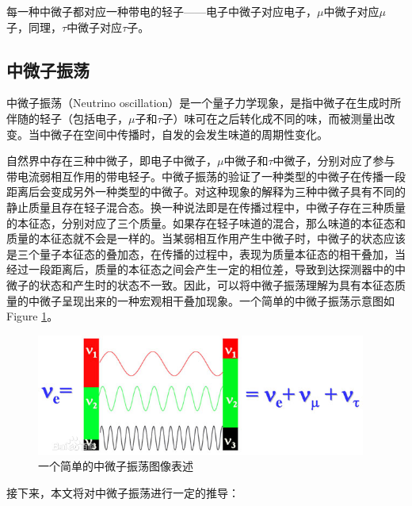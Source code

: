 \documentclass[10pt,a4paper]{article}
\begin{document}
每一种中微子都对应一种带电的轻子——电子中微子对应电子，$\mu$中微子对应$\mu$子，同理，$\tau$中微子对应$\tau$子。

\newpage

\subsection{中微子振荡}\label{sub:01}


中微子振荡（Neutrino oscillation）是一个量子力学现象，是指中微子在生成时所伴随的轻子（包括电子，$\mu$子和$\tau$子）味可在之后转化成不同的味，而被测量出改变。当中微子在空间中传播时，自发的会发生味道的周期性变化。

自然界中存在三种中微子，即电子中微子，$\mu$中微子和$\tau$中微子，分别对应了参与带电流弱相互作用的带电轻子。中微子振荡的验证了一种类型的中微子在传播一段距离后会变成另外一种类型的中微子。对这种现象的解释为三种中微子具有不同的静止质量且存在轻子混合态。换一种说法即是在传播过程中，中微子存在三种质量的本征态，分别对应了三个质量。如果存在轻子味道的混合，那么味道的本征态和质量的本征态就不会是一样的。当某弱相互作用产生中微子时，中微子的状态应该是三个量子本征态的叠加态，在传播的过程中，表现为质量本征态的相干叠加，当经过一段距离后，质量的本征态之间会产生一定的相位差，导致到达探测器中的中微子的状态和产生时的状态不一致。因此，可以将中微子振荡理解为具有本征态质量的中微子呈现出来的一种宏观相干叠加现象。一个简单的中微子振荡示意图如Figure \ref{fig:10}。


\begin{figure}[H]
 \centering
 \includegraphics[height=4cm]{images/中微子振荡示意图.jpg}
 \caption{一个简单的中微子振荡图像表述\cite{pic1}}
 \label{fig:10}
\end{figure}

接下来，本文将对中微子振荡进行一定的推导\cite{2007fun}\cite{2016Neutrino}\cite{2019Physics}：
\end{document}
